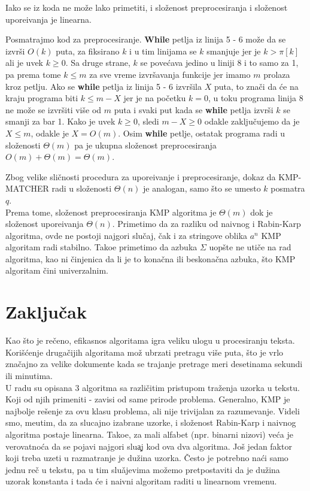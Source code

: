 \documentclass[a4paper,12pt]{article}
\begin{document}
Iako se iz koda ne mo\v ze lako primetiti, i slo\v zenost preprocesiranja i slo\v zenost upore\dj ivanja je linearna.

Posmatrajmo kod za preprocesiranje. {\bf While} petlja iz linija 5 - 6 mo\v ze da se izvr\v si $O(k)$ puta, za fiksirano $k$ i u tim linijama se $k$ smanjuje jer je $k > \pi[k]$ ali je uvek $k \geq 0$. Sa druge strane, $k$ se pove\' cava jedino u liniji 8 i to samo za 1, pa prema tome $k \leq m$ za sve vreme izvr\v savanja funkcije jer imamo $m$ prolaza kroz petlju. Ako se {\bf while} petlja iz linija 5 - 6 izvr\v sila $X$ puta, to zna\v ci da \' ce na kraju programa biti $k \leq m - X$ jer je na po\v cetku $k = 0$, u toku programa linija 8 ne mo\v ze se izvr\v siti vi\v se od $m$ puta i svaki put kada se {\bf while} petlja izvr\v si $k$ se smanji za bar 1. Kako je uvek $k \geq 0$, sledi $m - X \geq 0$ odakle zaklju\v cujemo da je $X \leq m$, odakle je $X = O(m)$. Osim {\bf while} petlje, ostatak programa radi u slo\v zenosti $\Theta(m)$ pa je ukupna slo\v zenost preprocesiranja $O(m) + \Theta(m) = \Theta(m)$.

Zbog velike sli\v cnosti procedura za upore\dj ivanje i preprocesiranje, dokaz da KMP-MATCHER radi u slo\v zenosti $\Theta(n)$ je analogan, samo \v sto se umesto $k$ posmatra $q$.
\\

Prema tome, slo\v zenost preprocesiranja KMP algoritma je $\Theta(m)$ dok je slo\v zenost upore\dj ivanja $\Theta(n)$. Primetimo da za razliku od naivnog i Rabin-Karp algoritma, ovde ne postoji najgori slu\v caj, \v cak i za stringove oblika $a^n$ KMP algoritam radi stabilno. Tako\dj e primetimo da azbuka $\Sigma$ uop\v ste ne uti\v ce na rad algoritma, kao ni \v cinjenica da li je to kona\v cna ili beskona\v cna azbuka, \v sto KMP algoritam \v cini univerzalnim.

\section{Zaklju\v cak}

Kao \v sto je re\v ceno, efikasnos algoritama igra veliku ulogu u procesiranju teksta. Kori\v s\' cenje druga\v cijih algoritama mo\v z ubrzati pretragu vi\v se puta, \v sto je vrlo zna\v cajno za velike dokumente kada se trajanje pretrage meri desetinama sekundi ili minutima.
\\

U radu su opisana 3 algoritma sa razli\v citim pristupom tra\v zenja uzorka u tekstu. Koji od njih primeniti - zavisi od same prirode problema. Generalno, KMP je najbolje re\v senje za ovu klasu problema, ali nije trivijalan za razumevanje. Videli smo, me\dj utim, da za slucajno izabrane uzorke, i slo\v zenost Rabin-Karp i naivnog algoritma postaje linearna. Tako\dj e, za mali alfabet (npr. binarni nizovi) ve\' ca je verovatno\' ca da se pojavi najgori slu\c aj kod ova dva algoritma. Jo\v s jedan faktor koji treba uzeti u razmatranje je du\v zina uzorka. \v Cesto je potrebno na\' ci samo jednu re\v c u tekstu, pa u tim slu\v ajevima mo\v zemo pretpostaviti da je du\v zina uzorak konstanta i tada \' ce i naivni algoritam raditi u linearnom vremenu.
\end{document}
